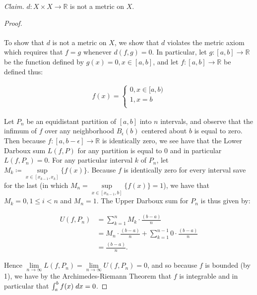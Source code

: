    \emph{Claim.} $d: X \times X \to \mathbb{R}$ is not a metric on $X$.
    \ \\

    \begin{proof}\ \\\\
        To show that $d$ is not a metric on $X$, we show that $d$ violates the metric axiom which requires
        that $f = g$ whenever $d(f, g) = 0$. In particular, let $g:[a, b] \to \mathbb{R}$ be the function defined
        by $g(x) = 0, x \in [a, b]$, and let $f:[a, b] \to \mathbb{R}$ be defined thus:

        \begin{align*}
            f(x) = \begin{cases}
                0, x \in [a, b) \\
                1, x = b \\
            \end{cases}
        \end{align*}

        Let $P_n$ be an equidistant partition of $[a, b]$ into $n$ intervals, and observe that the infimum of $f$ over
        any neighborhood $B_{\epsilon}(b)$ centered about $b$ is equal to zero. Then because \linebreak
        $f:[a, b - \epsilon] \to \mathbb{R}$ is identically zero, we see have that the Lower Darboux sum $L(f, P)$
        for any partition is equal to 0 and in particular $L(f, P_n) = 0$. For any particular interval $k$ of $P_n$, let 
        $M_k \coloneqq \sup\limits_{x \in [x_{k-1}, x_{k}]}{\{f(x)\}}$. Because $f$ is identically zero for every 
        interval save for the last (in which $M_n = \sup\limits_{x \in [x_{n-1}, b]}{\{f(x)\}} = 1$), we have that 
        $M_k = 0, 1 \le i < n$ and $M_n = 1$. The Upper Darboux sum for $P_n$ is thus given by:

        \begin{align*}
            U(f, P_n) &= \sum\limits_{k=1}^{n}{M_k \cdot \frac{(b - a)}{n}} \\
                      &= M_n \cdot \frac{(b - a)}{n} + \sum\limits_{k=1}^{n-1}{0 \cdot \frac{(b - a)}{n}} \\
                      &= \frac{(b - a)}{n}.
        \end{align*}

        Hence $\lim\limits_{n \to \infty}{L(f, P_n)} = \lim\limits_{n \to \infty}{U(f, P_n)} = 0$, and so because $f$
        is bounded (by 1), we have by the Archimedes-Riemann Theorem that $f$ is integrable and in 
        particular that $\int_a^b{f(x) \hspace{1mm} dx} = 0$.
        

\end{proof}
